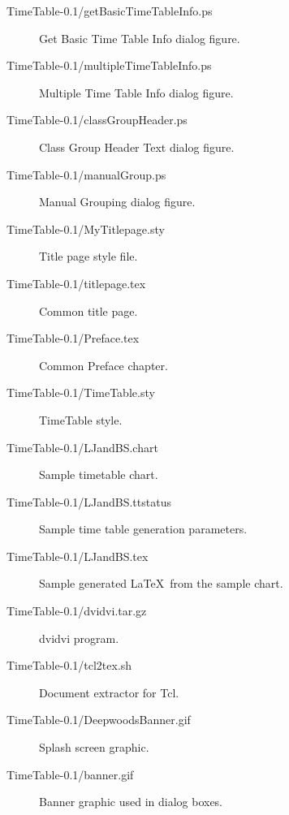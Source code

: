 \begin{description}
\item[TimeTable-0.1/getBasicTimeTableInfo.ps] Get Basic Time Table Info dialog figure.
\item[TimeTable-0.1/multipleTimeTableInfo.ps] Multiple Time Table Info dialog figure.
\item[TimeTable-0.1/classGroupHeader.ps] Class Group Header Text dialog figure.
\item[TimeTable-0.1/manualGroup.ps] Manual Grouping dialog figure.
\item[TimeTable-0.1/MyTitlepage.sty] Title page style file.
\item[TimeTable-0.1/titlepage.tex] Common title page.
\item[TimeTable-0.1/Preface.tex] Common Preface chapter.
\item[TimeTable-0.1/TimeTable.sty] TimeTable style.
\item[TimeTable-0.1/LJandBS.chart] Sample timetable chart.
\item[TimeTable-0.1/LJandBS.ttstatus] Sample time table generation parameters.
\item[TimeTable-0.1/LJandBS.tex] Sample generated \LaTeX\ from the sample chart.
\item[TimeTable-0.1/dvidvi.tar.gz] dvidvi program.
\item[TimeTable-0.1/tcl2tex.sh] Document extractor for Tcl.
\item[TimeTable-0.1/DeepwoodsBanner.gif] Splash screen graphic.
\item[TimeTable-0.1/banner.gif] Banner graphic used in dialog boxes.

\end{description}


